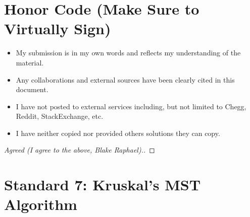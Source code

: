 \documentclass[11pt]{article}
\theoremstyle{definition}
\theoremstyle{definition}
\newtheorem{required}{Problem}
\theoremstyle{definition}
\begin{document}
\section{Honor Code (Make Sure to Virtually Sign)} \label{HonorCode}

\begin{itemize}
\item My submission is in my own words and reflects my understanding of the material.
\item Any collaborations and external sources have been clearly cited in this document.
\item I have not posted to external services including, but not limited to Chegg, Reddit, StackExchange, etc.
\item I have neither copied nor provided others solutions they can copy.
\end{itemize}


\begin{proof}[Agreed (I agree to the above, Blake Raphael).]
\end{proof}

\newpage
\section{Standard 7: Kruskal's MST Algorithm}
\setcounter{subsection}{1}
\end{document}
